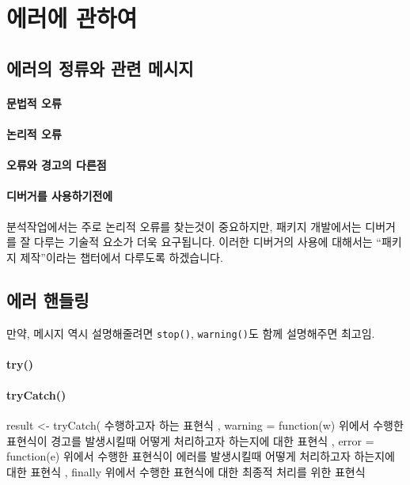 \documentclass{report}
\begin{document}
\section{에러에 관하여}

\subsection{에러의 정류와 관련 메시지}

\paragraph{문법적 오류}

\paragraph{논리적 오류}

\paragraph{오류와 경고의 다른점}

\paragraph{디버거를 사용하기전에}

분석작업에서는 주로 논리적 오류를 찾는것이 중요하지만, 패키지 개발에서는 디버거를 잘 다루는 기술적 요소가 더욱 요구됩니다. 
이러한 디버거의 사용에 대해서는 ``패키지 제작''이라는 챕터에서 다루도록 하겠습니다.

\subsection{에러 핸들링}
	만약, 메시지 역시 설명해줄려면  \texttt{stop()}, \texttt{warning()}도 함께 설명해주면 최고임.  
\paragraph{try()}

\paragraph{tryCatch()}

\begin{Schunk}
\begin{Soutput}
result <- tryCatch(
{
	수행하고자 하는 표현식
},
warning = function(w) {
	위에서 수행한 표현식이 경고를 발생시킬때 어떻게 처리하고자 하는지에 대한 표현식
},
error = function(e) {
	위에서 수행한 표현식이 에러를 발생시킬때 어떻게 처리하고자 하는지에 대한 표현식
}, finally {
	위에서 수행한 표현식에 대한 최종적 처리를 위한 표현식
}
\end{Soutput}
\end{Schunk}
\end{document}
